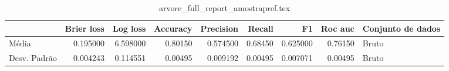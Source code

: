 \begin{table}
\centering
\caption{arvore_full_report_amostrapref.tex}
\label{arvore_full_report_amostrapref.tex}
\begin{tabular}{lrrrrrrrl}
\toprule
{} &  Brier  loss &  Log loss &  Accuracy  &  Precision  &  Recall  &       F1  &  Roc auc  & Conjunto de dados \\
\midrule
Média        &     0.195000 &  6.598000 &    0.80150 &    0.574500 &  0.68450 &  0.625000 &   0.76150 &             Bruto \\
Desv. Padrão &     0.004243 &  0.114551 &    0.00495 &    0.009192 &  0.00495 &  0.007071 &   0.00495 &             Bruto \\
\bottomrule
\end{tabular}
\end{table}
